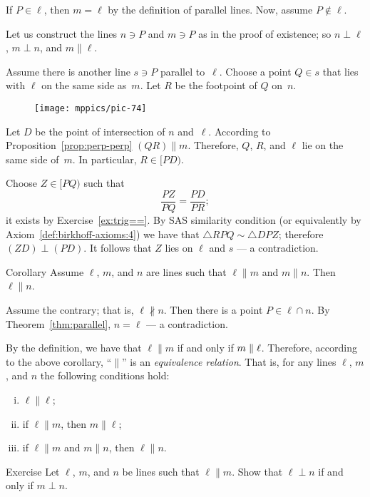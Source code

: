 If $P\in\ell$, then $m=\ell$ by the definition of parallel lines.
Now, assume $P\notin\ell$.

Let us construct the lines $n\ni P$ and $m\ni P$ as in the proof of existence; so $n\perp \ell$, $m\perp n$, and $m\parallel \ell$.

Assume there is another line $s\ni P$ parallel to~$\ell$.
Choose a point $Q\in s$ that lies with $\ell$ on the same side as~$m$.
Let $R$ be the footpoint of $Q$ on~$n$.

\begin{figure}[!ht]
\centering
\texttt{[image: mppics/pic-74]}
\end{figure}

Let $D$ be the point of intersection of $n$ and~$\ell$.
According to Proposition~\ref{prop:perp-perp} $(QR)\parallel m$. 
Therefore, $Q$, $R$, and $\ell$ lie on the same side of~$m$. 
In particular, $R\in [P D)$.

Choose $Z\in [P Q)$ such that 
$$\frac{PZ}{PQ}=\frac{PD}{PR};$$
it exists by Exercise~\ref{ex:trig==}.
By SAS similarity condition (or equivalently by Axiom~\ref{def:birkhoff-axioms:4})
we have that $\triangle RPQ\sim \triangle DPZ$;
therefore $(Z D)\perp(P D)$.
It follows that $Z$ lies on $\ell$ and $s$ --- a contradiction.\qeds

\begin{thm}{Corollary}\label{cor:parallel-1}
Assume $\ell$, $m$, and $n$ are lines
such that $\ell\parallel m$ and $m\parallel n$.
Then $\ell\parallel n$.
\end{thm}

Assume the contrary; that is, $\ell\nparallel n$.
Then there is a point $P\in \ell\cap n$.
By Theorem~\ref{thm:parallel},
$n=\ell$ --- a contradiction.
\qeds

By the definition, we have that $\ell\parallel m$ if and only if $m\parallel \ell$.
Therefore, according to the above corollary, ``$\parallel$'' is an 
\emph{equivalence relation}.
That is, for any lines $\ell$, $m$, and $n$ the following conditions hold:
\begin{enumerate}[(i)]
\item $\ell\parallel \ell$;
\item if $\ell\parallel m$, then $m\parallel \ell$;
\item if $\ell\parallel m$ and $m\parallel n$, then 
$\ell\parallel n$.
\end{enumerate}

\begin{thm}[!]{Exercise}\label{ex:perp-perp}
Let $\ell$, $m$, and $n$ be lines such that $\ell\parallel m$.
Show that $\ell\perp n$ if and only if $m\perp n$.
\end{thm}

